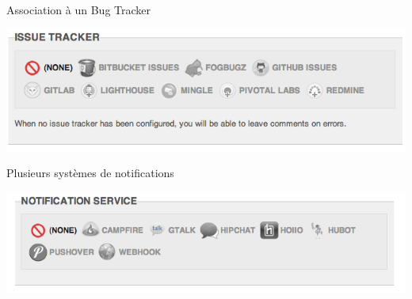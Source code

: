 \documentclass{beamer}
\begin{document}
\begin{frame}
  \begin{overlayarea}{10cm}{0.5cm}
    \centering
    \huge
    Association à un Bug Tracker
    \par
  \end{overlayarea}
  \begin{overlayarea}{10cm}{3cm}
    \centering
    \vfill
    \includegraphics[width=\linewidth]{issue_tracker.png}
  \end{overlayarea}
\end{frame}

\begin{frame}
  \begin{overlayarea}{10cm}{0.5cm}
    \centering
    \huge
    Plusieurs systèmes de notifications
    \par
  \end{overlayarea}
  \begin{overlayarea}{10cm}{3cm}
    \centering
    \vfill
    \includegraphics[width=\linewidth]{service_de_notification.png}
  \end{overlayarea}
\end{frame}
\end{document}

